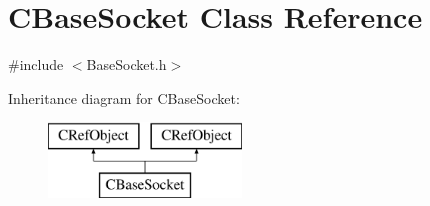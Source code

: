 \hypertarget{class_c_base_socket}{}\section{C\+Base\+Socket Class Reference}
\label{class_c_base_socket}


{\ttfamily \#include $<$Base\+Socket.\+h$>$}

Inheritance diagram for C\+Base\+Socket\+:\begin{figure}[H]
\begin{center}
\leavevmode
\includegraphics[height=2.000000cm]{class_c_base_socket}
\end{center}
\end{figure}
